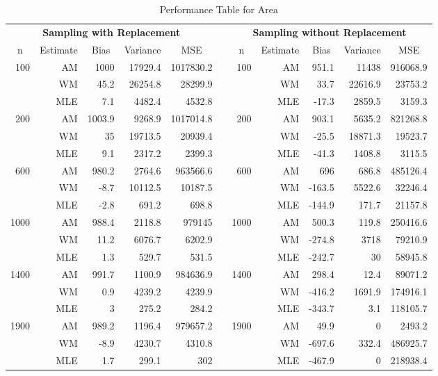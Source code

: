 \documentclass{article}\usepackage[]{graphicx}\usepackage[]{color}
\numberwithin{figure}{subsection} %
\numberwithin{table}{subsection} %
\begin{document}
\begin{table}[!tbp]
\begin{center}
\begin{tabular}{rrrrrcrrrrr}
\hline\hline
\multicolumn{5}{c}{\bfseries Sampling with Replacement}&\multicolumn{1}{c}{\bfseries }&\multicolumn{5}{c}{\bfseries Sampling without Replacement}\tabularnewline
\cline{1-11}
\multicolumn{1}{c}{n}&\multicolumn{1}{c}{Estimate}&\multicolumn{1}{c}{Bias}&\multicolumn{1}{c}{Variance}&\multicolumn{1}{c}{MSE}&\multicolumn{1}{c}{}&\multicolumn{1}{c}{n}&\multicolumn{1}{c}{Estimate}&\multicolumn{1}{c}{Bias}&\multicolumn{1}{c}{Variance}&\multicolumn{1}{c}{MSE}\tabularnewline
\hline
100&AM&1000&17929.4&1017830.2&&100&AM&951.1&11438&916068.9\tabularnewline
&WM&45.2&26254.8&28299.9&&&WM&33.7&22616.9&23753.2\tabularnewline
&MLE&7.1&4482.4&4532.8&&&MLE&-17.3&2859.5&3159.3\tabularnewline
200&AM&1003.9&9268.9&1017014.8&&200&AM&903.1&5635.2&821268.8\tabularnewline
&WM&35&19713.5&20939.4&&&WM&-25.5&18871.3&19523.7\tabularnewline
&MLE&9.1&2317.2&2399.3&&&MLE&-41.3&1408.8&3115.5\tabularnewline
600&AM&980.2&2764.6&963566.6&&600&AM&696&686.8&485126.4\tabularnewline
&WM&-8.7&10112.5&10187.5&&&WM&-163.5&5522.6&32246.4\tabularnewline
&MLE&-2.8&691.2&698.8&&&MLE&-144.9&171.7&21157.8\tabularnewline
1000&AM&988.4&2118.8&979145&&1000&AM&500.3&119.8&250416.6\tabularnewline
&WM&11.2&6076.7&6202.9&&&WM&-274.8&3718&79210.9\tabularnewline
&MLE&1.3&529.7&531.5&&&MLE&-242.7&30&58945.8\tabularnewline
1400&AM&991.7&1100.9&984636.9&&1400&AM&298.4&12.4&89071.2\tabularnewline
&WM&0.9&4239.2&4239.9&&&WM&-416.2&1691.9&174916.1\tabularnewline
&MLE&3&275.2&284.2&&&MLE&-343.7&3.1&118105.7\tabularnewline
1900&AM&989.2&1196.4&979657.2&&1900&AM&49.9&0&2493.2\tabularnewline
&WM&-8.9&4230.7&4310.8&&&WM&-697.6&332.4&486925.7\tabularnewline
&MLE&1.7&299.1&302&&&MLE&-467.9&0&218938.4\tabularnewline
\hline
\end{tabular}

\caption{Performance Table for Area\label{tab_size_est}}\end{center}

\end{table}
\end{document}
